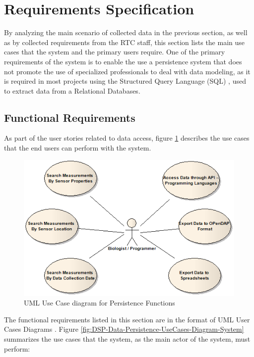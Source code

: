 \section{Requirements Specification}

By analyzing the main scenario of collected data in the previous section, as
well as by collected requirements from the RTC staff, this section lists the
main use cases that the system and the primary users require. One of the
primary requirements of the system is to enable the use a persistence system
that does not promote the use of specialized professionals to deal with data
modeling, as it is required in most projects using the Structured Query
Language (SQL) \cite{sql}, used to extract data from a Relational Databases.

\subsection{Functional Requirements}
\label{sec:use-cases}

As part of the user stories related to data access, figure
\ref{fig:DSP-Data-Persistence-UseCases-Diagram-Users} describes the use cases
that the end users can perform with the system.

\begin{figure}[!b]
  \centering
  \includegraphics[scale=0.5]{../diagrams/DSP-Data-Persistence-UseCases-Diagram-Users}
  \caption{UML Use Case diagram for Persistence Functions}
  \label{fig:DSP-Data-Persistence-UseCases-Diagram-Users}
\end{figure}

The functional requirements listed in this section are in the format of UML
User Cases Diagrams \cite{uml}. Figure
\ref{fig:DSP-Data-Persistence-UseCases-Diagram-System} summarizes the use 
cases that the system, as the main actor of the system, must perform:

